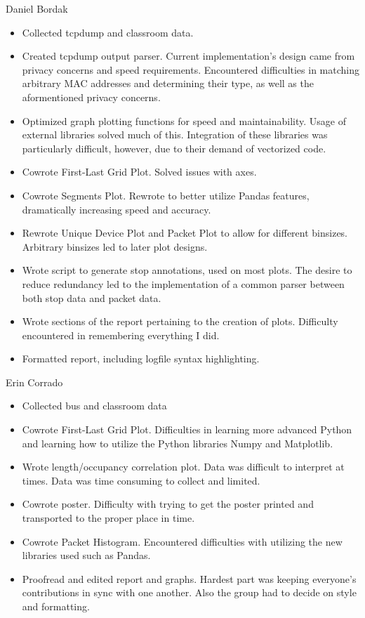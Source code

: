 \documentclass[12pt,journal,compsoc]{IEEEtran} %
\begin{document}
\clearpage

Daniel Bordak
\begin{itemize}
\item Collected tcpdump and classroom data.
\item Created tcpdump output parser.
  Current implementation's design came from privacy concerns and speed requirements.
  Encountered difficulties in matching arbitrary MAC addresses and determining their type, as well as the aformentioned privacy concerns.
\item Optimized graph plotting functions for speed and maintainability.
  Usage of external libraries solved much of this.
  Integration of these libraries was particularly difficult, however, due to their demand of vectorized code.
\item Cowrote First-Last Grid Plot.
  Solved issues with axes.
\item Cowrote Segments Plot.
  Rewrote to better utilize Pandas features, dramatically increasing speed and accuracy.
\item Rewrote Unique Device Plot and Packet Plot to allow for different binsizes.
  Arbitrary binsizes led to later plot designs.
\item Wrote script to generate stop annotations, used on most plots.
  The desire to reduce redundancy led to the implementation of a common parser between both stop data and packet data.
\item Wrote sections of the report pertaining to the creation of plots.
  Difficulty encountered in remembering everything I did.%
\item Formatted report, including logfile syntax highlighting.
\end{itemize}
Erin Corrado
\begin{itemize}
\item Collected bus and classroom data
\item Cowrote First-Last Grid Plot.
  Difficulties in learning more advanced Python and learning how to utilize the Python libraries Numpy and Matplotlib.
\item Wrote length/occupancy correlation plot.
  Data was difficult to interpret at times.
  Data was time consuming to collect and limited.
\item Cowrote poster.
  Difficulty with trying to get the poster printed and transported to the proper place in time.
\item Cowrote Packet Histogram.
  Encountered difficulties with utilizing the new libraries used such as Pandas.
\item Proofread and edited report and graphs.
  Hardest part was keeping everyone's contributions in sync with one another.
  Also the group had to decide on style and formatting.
\end{itemize}
\end{document}
